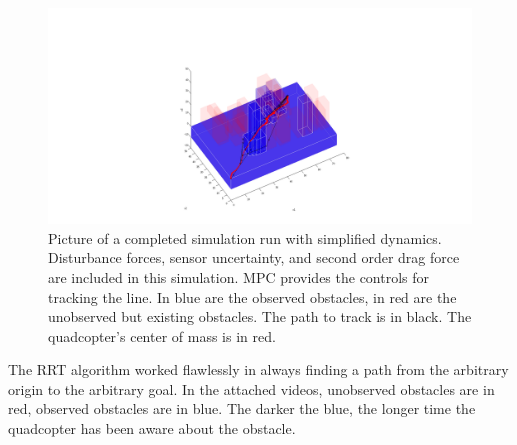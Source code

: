 \begin{figure}[]
\centering
\includegraphics[width=22cm]{sample_simulation.png}
\caption{Picture of a completed simulation run with simplified dynamics. Disturbance forces, sensor uncertainty, and second order drag force are included in this simulation. MPC provides the controls for tracking the line. In blue are the observed obstacles, in red are the unobserved but existing obstacles. The path to track is in black. The quadcopter's center of mass is in red.}
\label{fig:sample_simulation}
\end{figure}


The RRT algorithm worked flawlessly in always finding a path from the arbitrary origin to the arbitrary goal. In the attached videos, unobserved obstacles are in red, observed obstacles are in blue. The darker the blue, the longer time the quadcopter has been aware about the obstacle.
